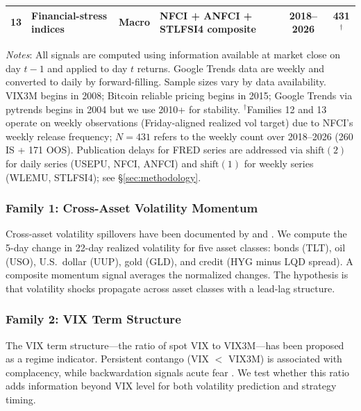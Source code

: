 \documentclass[12pt,a4paper]{article}
\begin{document}
\begin{table}[H]
\begin{threeparttable}
{\begin{tabular}{@{}clllcc@{}}
13 & Financial-stress indices & Macro & NFCI + ANFCI + STLFSI4 composite \citep{brave2011, kliesen2010} & 2018--2026 & 431$^\dagger$ \\ %
\bottomrule
\end{tabular}%
}
\begin{tablenotes}
\small
\item \textit{Notes}: All signals are computed using information available at market close on day $t-1$ and applied to day $t$ returns. Google Trends data are weekly and converted to daily by forward-filling. Sample sizes vary by data availability. VIX3M begins in 2008; Bitcoin reliable pricing begins in 2015; Google Trends via pytrends begins in 2004 but we use 2010+ for stability. $^\dagger$Families 12 and 13 operate on weekly observations (Friday-aligned realized vol target) due to NFCI's weekly release frequency; $N=431$ refers to the weekly count over 2018--2026 (260 IS + 171 OOS). Publication delays for FRED series are addressed via $\text{shift}(2)$ for daily series (USEPU, NFCI, ANFCI) and $\text{shift}(1)$ for weekly series (WLEMU, STLFSI4); see \S\ref{sec:methodology}.
\end{tablenotes}
\end{threeparttable}
\end{table}

\subsubsection{Family 1: Cross-Asset Volatility Momentum}

Cross-asset volatility spillovers have been documented by \citet{diebold2012} and \citet{barunik2016}. We compute the 5-day change in 22-day realized volatility for five asset classes: bonds (TLT), oil (USO), U.S.\ dollar (UUP), gold (GLD), and credit (HYG minus LQD spread). A composite momentum signal averages the normalized changes. The hypothesis is that volatility shocks propagate across asset classes with a lead-lag structure.

\subsubsection{Family 2: VIX Term Structure}

The VIX term structure---the ratio of spot VIX to VIX3M---has been proposed as a regime indicator. Persistent contango (VIX $<$ VIX3M) is associated with complacency, while backwardation signals acute fear \citep{luo2019}. We test whether this ratio adds information beyond VIX level for both volatility prediction and strategy timing.
\end{document}
